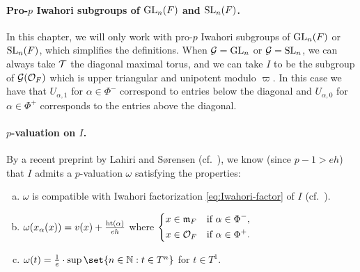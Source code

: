 \paragraph{Pro-$p$ Iwahori subgroups of $\operatorname{GL}_{n}(F)$ and $\operatorname{SL}_{n}(F)$.} In this chapter, we will only work with pro-$p$ Iwahori subgroups of $\operatorname{GL}_{n}(F)$ or $\operatorname{SL}_{n}(F)$, which simplifies the definitions. When $\mathcal{G} = \operatorname{GL}_{n}$ or $\mathcal{G} = \operatorname{SL}_{n}$, we can always take $\mathcal{T}$ the diagonal maximal torus, and we can take $I$ to be the subgroup of $\mathcal{G}(\mathcal{O}_{F})$ which is upper triangular and unipotent modulo $\varpi$. In this case we have that $U_{\alpha,1}$ for $\alpha \in \Phi^{-}$ correspond to entries below the diagonal and $U_{\alpha,0}$ for $\alpha \in \Phi^{+}$ corresponds to the entries above the diagonal.

\paragraph{$p$-valuation on $I$.} By a recent preprint by Lahiri and Sørensen (cf.\ \cite[Prop.~3.4]{IwaBasis}), we know (since $p-1 > eh$) that $I$ admits a $p$-valuation $\omega$ satisfying the properties:
\begin{enumerate}[(a)]
  \item $\omega$ is compatible with Iwahori factorization \eqref{eq:Iwahori-factor} of $I$ (cf.\ \cite[Def.~3.3]{IwaBasis}).
  \item $\omega(x_{\alpha}(x)) = v(x) + \frac{\operatorname{ht}(\alpha)}{eh}$ where $\begin{dcases}
    x \in \mathfrak{m}_{F} & \text{if } \alpha \in \Phi^{-}, \\
    x \in \mathcal{O}_{F} & \text{if } \alpha \in \Phi^{+}.
  \end{dcases}$
  \item $\omega(t) = \frac{1}{e} \cdot \sup\set{n \in \N : t \in T^{n}}$ for $t \in T^{1}$.
\end{enumerate}

